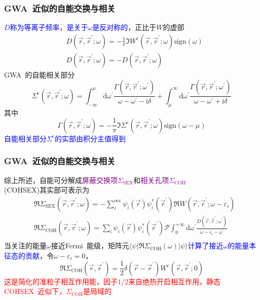 \documentclass[cjk,slidestop,compress,mathserif,blue]{beamer}
\begin{document}
\frame
{
	\frametitle{\textrm{GWA~}近似的自能交换与相关}
	\textcolor{blue}{$D$称为等离子频率，是关于$\omega$是反对称的}，正比于$W$的虚部
	\begin{displaymath}
		\begin{aligned}
			&D(\vec r,\vec r^{\prime};\omega)=-\frac1{\pi}\Im W^{\mathrm{c}}(\vec r,\vec r^{\prime};\omega)\textrm{sign}(\omega)\\
			&D(\vec r,\vec r^{\prime};\omega)=-D(\vec r,\vec r^{\prime};\omega)
		\end{aligned}
	\end{displaymath}
	\textrm{GWA~}的自能相关部分
	\begin{displaymath}
		\Sigma^{\mathrm{c}}(\vec r,\vec r^{\prime};\omega)=\int_{-\infty}^{\mu}\mathrm{d}\omega^{\prime}\frac{\Gamma(\vec r,\vec r^{\prime};\omega^{\prime})}{\omega-\omega^{\prime}-\mathrm{i}\delta}+\int_{\mu}^{\infty}\mathrm{d}\omega^{\prime}\frac{\Gamma(\vec r,\vec r^{\prime};\omega^{\prime})}{\omega-\omega^{\prime}+\mathrm{i}\delta}
	\end{displaymath}
	其中
	\begin{displaymath}
		\Gamma(\vec r,\vec r^{\prime};\omega)=-\frac1{\pi}\Im\Sigma^{\mathrm{c}}(\vec r,\vec r^{\prime};\omega)\textrm{sign}(\omega-\mu)
	\end{displaymath}
	\textcolor{blue}{自能相关部分$\Sigma^{\mathrm{c}}$的实部由积分主值得到}
}

\frame
{
	\frametitle{\textrm{GWA~}近似的自能交换与相关}
	综上所述，自能可分解成\textcolor{purple}{屏蔽交换项$\Sigma_{\mathrm{SEX}}$}和\textcolor{purple}{相关孔项$\Sigma_{\mathrm{COH}}$}\\(\textrm{COHSEX})其实部可表示为
	\begin{displaymath}
		\begin{aligned}
			&\Re\Sigma_{\mathrm{SEX}}(\vec r,\vec r^{\prime};\omega)=-\sum_i^{\mathrm{occ}}\psi_i(\vec r)\psi_i^{\ast}(\vec r^{\prime})\Re W(\vec r,\vec r^{\prime};\omega-\varepsilon_i)\\
			&\Re\Sigma_{\mathrm{COH}}(\vec r,\vec r^{\prime};\omega)=\sum_i\psi_i(\vec r)\psi_i^{\ast}(\vec r^{\prime})\mathscr{P}\int_0^{+\infty}\mathrm{d}\omega^{\prime}\frac{D(\vec r,\vec r^{\prime};\omega^{\prime})}{\omega-\varepsilon_i-\omega^{\prime}}\\
		\end{aligned}
	\end{displaymath}
	当关注的能量$\omega$接近\textrm{Fermi~}能级，矩阵元$\langle\psi|\Re\Sigma_{\mathrm{COH}}(\omega)|\psi\rangle$\textcolor{blue}{计算了接近$\omega$的能量本征态的贡献}，令$\omega-\varepsilon_i=0$，
	\begin{displaymath}
		\Re\Sigma_{\mathrm{COH}}(\vec r,\vec r^{\prime})=\frac12\delta(\vec r-\vec r^{\prime})W^{\mathrm{c}}(\vec r,\vec r^{\prime};0)
	\end{displaymath}
	\textcolor{red}{这是简化的准粒子相互作用能，因子$1/2$来自绝热开启相互作用，静态\textrm{COHSEX~}近似下，$\Sigma_{\mathrm{COH}}$是局域的}
}
\end{document}
